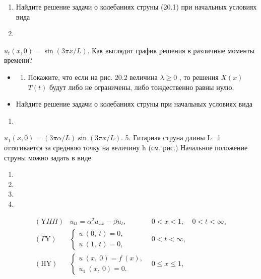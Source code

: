 \documentclass[
  ukrainian,
]{article}
\providecommand{\tightlist}{%
  \setlength{\itemsep}{0pt}\setlength{\parskip}{0pt}}
\begin{document}
\begin{enumerate}
\def\labelenumi{\arabic{enumi}.}
\setcounter{enumi}{1}
\item
  Найдите решение задачи о колебаниях струны (20.1) при начальных
  условиях вида
\item
\end{enumerate}

\(u_t(x, 0) = \sin(3\pi x/L).\) Как выглядит график решения в различные
моменты времени?

\begin{itemize}
\tightlist
\item
  \begin{enumerate}
  \def\labelenumi{\arabic{enumi}.}
  \setcounter{enumi}{2}
  \tightlist
  \item
    Покажите, что если на рис. 20.2 величина \(\lambda \geqslant 0\) ,
    то решения \(X(x)\) \(T(t)\) будут либо не ограничены, либо
    тождественно равны нулю.
  \end{enumerate}
\item
  Найдите решение задачи о колебаниях струны при начальных условиях вида
\end{itemize}

\begin{enumerate}
\def\labelenumi{\arabic{enumi}.}
\setcounter{enumi}{11}
\tightlist
\item
\end{enumerate}

\(u_1(x, 0) = (3\pi \alpha/L)\sin(3\pi x/L).\) 5. Гитарная струна длины
L=1 оттягивается за среднюю точку на величину h (см. рис.) Начальное
положение струны можно задать в виде

\begin{enumerate}
\def\labelenumi{\arabic{enumi}.}
\setcounter{enumi}{12}
\tightlist
\item
\item
\item
\item
\end{enumerate}

\[
\begin{array}{llll} (\mathrm{Y} \Pi \Pi) & u_{tt} = \alpha^2 u_{xx} - \beta u_t, & 0 < x < 1, & 0 < t < \infty, \\ (\Gamma \mathrm{Y}) & \begin{cases} u \ (0, \ t) = 0, \\ u \ (1, \ t) = 0, \end{cases} & 0 < t < \infty, \\ (\mathrm{H} \mathrm{Y}) & \begin{cases} u \ (x, \ 0) = f \ (x), \\ u_1 \ (x, \ 0) = 0. \end{cases} & 0 \leqslant x \leqslant 1, \end{array}
\]
\end{document}
